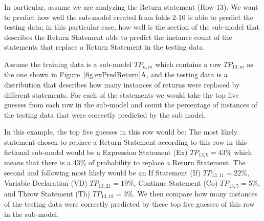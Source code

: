 \documentclass[conference]{IEEEtran}
\begin{document}
% 


In 
particular, assume we are analyzing the Return statement (Row 13). We want to 
predict 
how well the sub-model created from folds 2-10 is able to predict the testing 
data; in this particular case, how well is the section of the sub-model that 
describes the Return Statement able to predict the instance count of the 
statements that replace a Return Statement in the testing data.

Assume the training data is a sub-model $TP_{n,m}$ which contains a row 
$TP_{13,m}$ as the one shown in Figure~\ref{fig:exPredReturn}A, and the testing data is a distribution that describes 
how many instances of returns were replaced by different statements.
For each of the statements we would take the top five guesses from each row in 
the sub-model and count the percentage of instances of the testing data that were correctly 
predicted by the sub model. 

In this example, the top five guesses in this row would be: The most 
likely statement chosen to replace a Return Statement according to this row in 
this fictional sub-model would be a Expression Statement (Ex) $TP_{13,9} = 43\%$ 
which means that there is a 43\% of probability to replace a Return Statement. 
The second and following most likely would be an If Statement (If) $TP_{13,11} = 22\%$, Variable Declaration (VD)  $TP_{13,21} = 19\%$, 
Continue Statement (Co)  $TP_{13,5} = 5\%$, and Throw Statement (Th) $TP_{13,18} = 3\%$. We then compare how many instances of the testing data were correctly predicted 
by these top five guesses of this row in the sub-model. 
\end{document}
